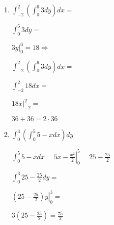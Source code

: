 \documentclass[../practica_08.tex]{subfiles}
\begin{document}
    \begin{enumerate}
        \item $ \int_{-2}^{2} (\int_0^6 3 dy) dx = $

            $ \int_0^6 3 dy = $

            $ \left. 3y \right |_0^6 = 18 \Rightarrow$

            $ \int_{-2}^{2} (\int_0^6 3 dy) dx = $

            $ \int_{-2}^{2} 18 dx = $

            $ \left. 18x \right |_{-2}^{2} = $

            $ 36 + 36 = 2\cdot 36 $

        \item $ \int_0^3 ( \int_0^5 5-x dx  ) dy $

            $\int_0^5 5-x dx = \left. 5x-\frac{x^2}{2}  \right |_0^5 = 25-\frac{25}{2} $

            $ \int_0^3 25-\frac{25}{2} dy = $

            $\left. (25-\frac{25}{2})y \right |_0^3= $

            $ 3(25-\frac{25}{2}) = \frac{75}{2}$

    \end{enumerate}
\end{document}
